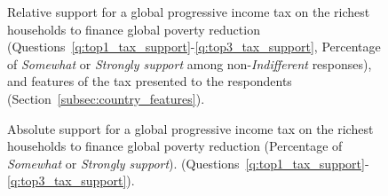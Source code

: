 
\begin{figure}[h!]
    \caption[Relative support for a global income tax on the richest to fund LICs]{Relative support for a global progressive income tax on the richest households to finance global poverty reduction (Questions~\ref{q:top1_tax_support}-\ref{q:top3_tax_support}, Percentage of \textit{Somewhat} or \textit{Strongly support} among non-\textit{Indifferent} responses), and features of the tax presented to the respondents (Section~\ref{subsec:country_features}).
    }\label{fig:top_tax_share}
\end{figure}

\begin{figure}[h!]
    \caption[Absolute support for an income tax on top 1\% to fund LICs]{Absolute support for a global progressive income tax on the richest households to finance global poverty reduction (Percentage of \textit{Somewhat} or \textit{Strongly support}). (Questions~\ref{q:top1_tax_support}-\ref{q:top3_tax_support}).
    }\label{fig:top_tax_positive}
\end{figure}

